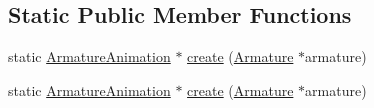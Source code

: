 \subsection*{Static Public Member Functions}
\begin{DoxyCompactItemize}
\item 
static \hyperlink{classcocostudio_1_1ArmatureAnimation}{Armature\+Animation} $\ast$ \hyperlink{classcocostudio_1_1ArmatureAnimation_a7f201b841cb3727578f8bf5703bec29d}{create} (\hyperlink{classcocostudio_1_1Armature}{Armature} $\ast$armature)
\item 
static \hyperlink{classcocostudio_1_1ArmatureAnimation}{Armature\+Animation} $\ast$ \hyperlink{classcocostudio_1_1ArmatureAnimation_afb74b4d9674a8d8f8f7c83305d33a457}{create} (\hyperlink{classcocostudio_1_1Armature}{Armature} $\ast$armature)
\end{DoxyCompactItemize}
